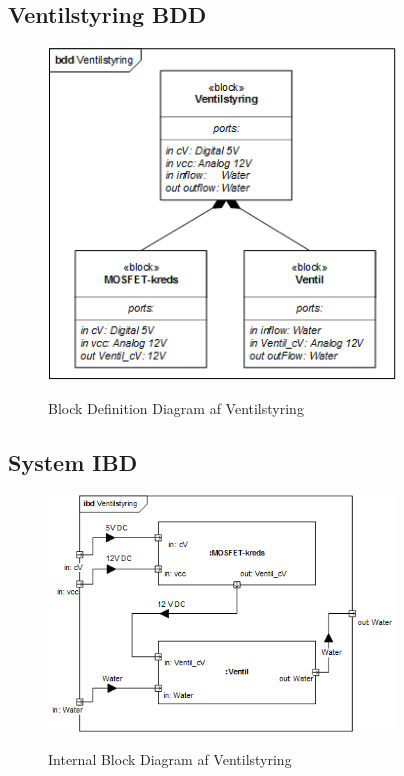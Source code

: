 
\subsection{Ventilstyring BDD}

\begin{figure}[H]
	\centering
	\includegraphics[width=0.82\textwidth]{Systemarkitektur/Ventiler/Ventilstyring_BDD.png}
	\label{fig:Ventilstyring BDD}
	\caption{Block Definition Diagram af Ventilstyring}
\end{figure}



\subsection{System IBD}

\begin{figure}[H]
	\centering
	\includegraphics[width=0.82\textwidth]{Systemarkitektur/Ventiler/Ventilstyring_IBD.png}
	\label{fig:Ventilstyring IBD}
	\caption{Internal Block Diagram af Ventilstyring}
\end{figure}



